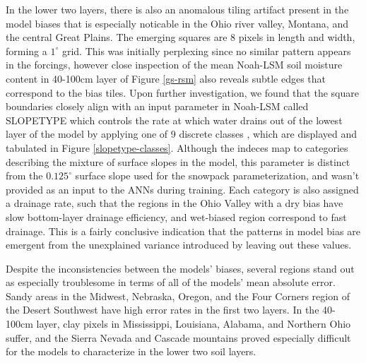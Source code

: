 In the lower two layers, there is also an anomalous tiling artifact present in the model biases that is especially noticable in the Ohio river valley, Montana, and the central Great Plains. The emerging squares are 8 pixels in length and width, forming a $1^\circ$ grid. This was initially perplexing since no similar pattern appears in the forcings, however close inspection of the mean Noah-LSM soil moisture content in 40-100cm layer of Figure \ref{gs-rsm} also reveals subtle edges that correspond to the bias tiles. Upon further investigation, we found that the square boundaries closely align with an input parameter in Noah-LSM called SLOPETYPE which controls the rate at which water drains out of the lowest layer of the model by applying one of 9 discrete classes \citep{mitchell_community_2005}, which are displayed and tabulated in Figure \ref{slopetype-classes}. Although the indeces map to categories describing the mixture of surface slopes in the model, this parameter is distinct from the $0.125^\circ$ surface slope used for the snowpack parameterization, and wasn't provided as an input to the ANNs during training. Each category is also assigned a drainage rate, such that the regions in the Ohio Valley with a dry bias have slow bottom-layer drainage efficiency, and wet-biased region correspond to fast drainage. This is a fairly conclusive indication that the patterns in model bias are emergent from the unexplained variance introduced by leaving out these values.

Despite the inconsistencies between the models' biases, several regions stand out as especially troublesome in terms of all of the models' mean absolute error. Sandy areas in the Midwest, Nebraska, Oregon, and the Four Corners region of the Desert Southwest have high error rates in the first two layers. In the 40-100cm layer, clay pixels in Mississippi, Louisiana, Alabama, and Northern Ohio suffer, and the Sierra Nevada and Cascade mountains proved especially difficult for the models to characterize in the lower two soil layers.

%
%

